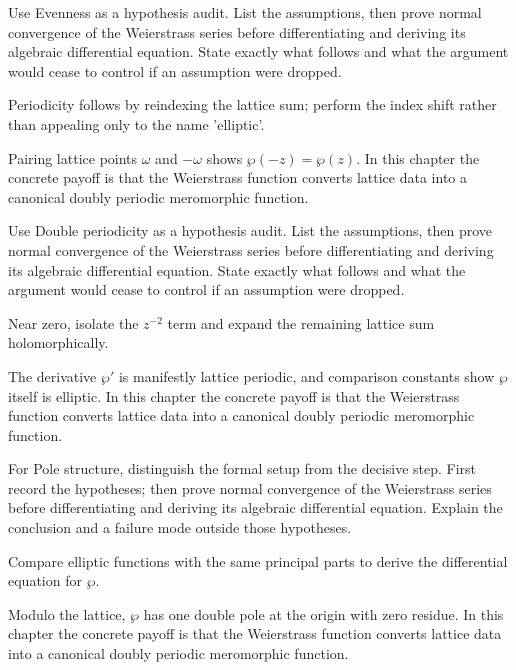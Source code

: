 \begin{exercise}\label{exr:iv29-03}
Use Evenness as a hypothesis audit. List the assumptions, then prove normal convergence of the Weierstrass series before differentiating and deriving its algebraic differential equation. State exactly what follows and what the argument would cease to control if an assumption were dropped.
\end{exercise}
\begin{hint}
Periodicity follows by reindexing the lattice sum; perform the index shift rather than appealing only to the name 'elliptic'.
\end{hint}
\begin{solution}
Pairing lattice points $\omega$ and $-\omega$ shows $\wp(-z)=\wp(z)$. In this chapter the concrete payoff is that the Weierstrass function converts lattice data into a canonical doubly periodic meromorphic function.
\end{solution}

\begin{exercise}\label{exr:iv29-04}
Use Double periodicity as a hypothesis audit. List the assumptions, then prove normal convergence of the Weierstrass series before differentiating and deriving its algebraic differential equation. State exactly what follows and what the argument would cease to control if an assumption were dropped.
\end{exercise}
\begin{hint}
Near zero, isolate the \(z^{-2}\) term and expand the remaining lattice sum holomorphically.
\end{hint}
\begin{solution}
The derivative $\wp'$ is manifestly lattice periodic, and comparison constants show $\wp$ itself is elliptic. In this chapter the concrete payoff is that the Weierstrass function converts lattice data into a canonical doubly periodic meromorphic function.
\end{solution}

\begin{exercise}\label{exr:iv29-05}
For Pole structure, distinguish the formal setup from the decisive step. First record the hypotheses; then prove normal convergence of the Weierstrass series before differentiating and deriving its algebraic differential equation. Explain the conclusion and a failure mode outside those hypotheses.
\end{exercise}
\begin{hint}
Compare elliptic functions with the same principal parts to derive the differential equation for \(\wp\).
\end{hint}
\begin{solution}
Modulo the lattice, $\wp$ has one double pole at the origin with zero residue. In this chapter the concrete payoff is that the Weierstrass function converts lattice data into a canonical doubly periodic meromorphic function.
\end{solution}

